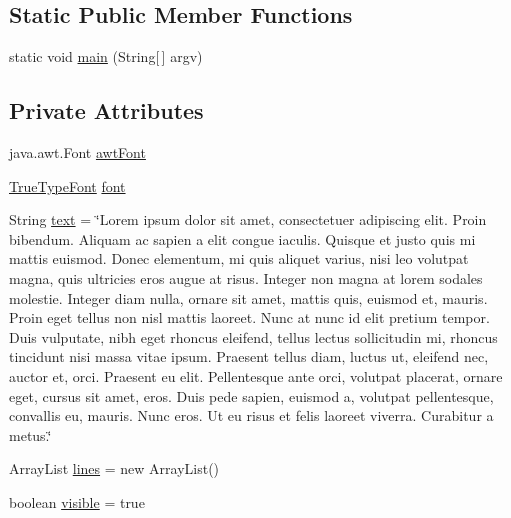 \subsection*{Static Public Member Functions}
\begin{DoxyCompactItemize}
\item 
static void \mbox{\hyperlink{classorg_1_1newdawn_1_1slick_1_1tests_1_1_true_type_font_performance_test_a659622d290bb7e7ba15992c36adde880}{main}} (String\mbox{[}$\,$\mbox{]} argv)
\end{DoxyCompactItemize}
\subsection*{Private Attributes}
\begin{DoxyCompactItemize}
\item 
java.\+awt.\+Font \mbox{\hyperlink{classorg_1_1newdawn_1_1slick_1_1tests_1_1_true_type_font_performance_test_a12e347d7b9731b4f83c74788a6365d2d}{awt\+Font}}
\item 
\mbox{\hyperlink{classorg_1_1newdawn_1_1slick_1_1_true_type_font}{True\+Type\+Font}} \mbox{\hyperlink{classorg_1_1newdawn_1_1slick_1_1tests_1_1_true_type_font_performance_test_a9467d66083a8e6d0f93ee5290e49896d}{font}}
\item 
String \mbox{\hyperlink{classorg_1_1newdawn_1_1slick_1_1tests_1_1_true_type_font_performance_test_a8045648a167ec69ae4840c0bd711c4bb}{text}} = \char`\"{}Lorem ipsum dolor sit amet, consectetuer adipiscing elit. Proin bibendum. Aliquam ac sapien a elit congue iaculis. Quisque et justo quis mi mattis euismod. Donec elementum, mi quis aliquet varius, nisi leo volutpat magna, quis ultricies eros augue at risus. Integer non magna at lorem sodales molestie. Integer diam nulla, ornare sit amet, mattis quis, euismod et, mauris. Proin eget tellus non nisl mattis laoreet. Nunc at nunc id elit pretium tempor. Duis vulputate, nibh eget rhoncus eleifend, tellus lectus sollicitudin mi, rhoncus tincidunt nisi massa vitae ipsum. Praesent tellus diam, luctus ut, eleifend nec, auctor et, orci. Praesent eu elit. Pellentesque ante orci, volutpat placerat, ornare eget, cursus sit amet, eros. Duis pede sapien, euismod a, volutpat pellentesque, convallis eu, mauris. Nunc eros. Ut eu risus et felis laoreet viverra. Curabitur a metus.\char`\"{}
\item 
Array\+List \mbox{\hyperlink{classorg_1_1newdawn_1_1slick_1_1tests_1_1_true_type_font_performance_test_a321f5b369149b9e1892239932b2828ae}{lines}} = new Array\+List()
\item 
boolean \mbox{\hyperlink{classorg_1_1newdawn_1_1slick_1_1tests_1_1_true_type_font_performance_test_aff78102bb4082a1dd8e34dc6152a51b2}{visible}} = true
\end{DoxyCompactItemize}

